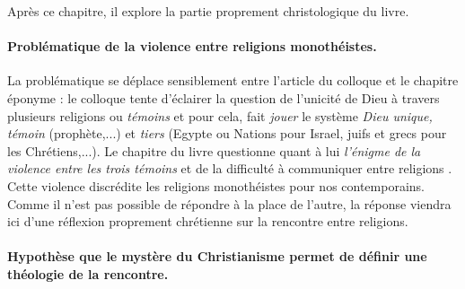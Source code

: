 Après ce chapitre, il explore la partie proprement christologique du livre. 
\paragraph{Problématique de la violence entre religions monothéistes.}

\begin{comment}
   Déterminer la problématique en vous inspirant des questions suivantes :
Après la phase de lecture pas à pas, vous construisez la question à laquelle l’auteur s’affronte :
-	pourquoi l’auteur se bat-il ?
-	quel problème essaie-t-il de régler, d’éclairer ? En général, il n’est pas difficile de trouver exposée la problématique en toute lettre dans le texte lui-même – parfois même de manière redondante ;
-	en fonction de quel contexte culturel, social, culturel, économique, politique l’auteur construit-il sa problématique ? Notez les événements déterminants auxquels il se réfère et les auteurs qu’il évoque – plus ou moins explicitement – comme ses alliés ou ses adversaires – et le cas échéant, renseignez-vous sur eux.  
\end{comment}
La problématique se déplace sensiblement entre l'article du colloque et le chapitre éponyme : le colloque tente d'éclairer la question de l'unicité de Dieu à travers plusieurs religions ou \textit{témoins} et pour cela, fait \textit{jouer} le système \textit{Dieu unique, témoin} (prophète,...) et \textit{tiers} (Egypte ou Nations pour Israel, juifs et grecs pour les Chrétiens,...). 
Le chapitre  du livre questionne quant à lui  \textit{l'énigme de la violence entre les trois témoins} et de la difficulté à communiquer entre religions \cite[p.780]{theobald_christianisme_2007}. Cette violence discrédite les religions monothéistes pour nos contemporains. Comme il n'est pas possible de répondre à la place de l'autre, la réponse viendra ici d'une réflexion proprement chrétienne sur la rencontre entre religions.

\paragraph{Hypothèse que le mystère du Christianisme permet de définir une théologie de la rencontre.}


